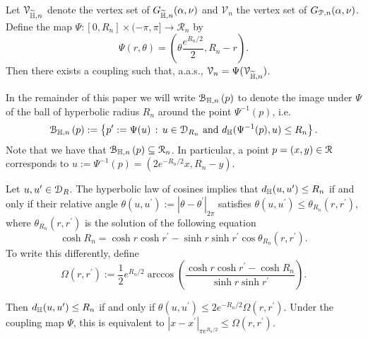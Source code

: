 \begin{lemma}\label{lem:coupling_hyperbolic_poisson}
Let $\mathcal{V}_{\widetilde{\mathbb{H}}, n}$ denote the vertex set of $G_{\widetilde{\mathbb{H}},n}(\alpha, \nu)$ and $\mathcal{V}_n$ the vertex set of $G_{{\mathcal P},n}(\alpha, \nu)$. Define the map $\Psi : [0,R_n] \times (-\pi, \pi] \to \mathcal{R}_n$ by
\begin{equation}\label{eq:def_Psi}
	\Psi(r,\theta) = \left(\theta \frac{e^{R_n/2}}{2}, R_n - r\right).
\end{equation}
Then there exists a coupling such that, a.a.s., $\mathcal{V}_n = \Psi(\mathcal{V}_{\widetilde{\mathbb{H}},n})$. %
\end{lemma}

In the remainder of this paper we will write ${\mathcal B}_{\mathbb{H},n}\left(p\right)$ to denote the image under $\Psi$ of the ball of hyperbolic radius $R_n$ around the point $\Psi^{-1}(p)$, i.e. 
\[
	{\mathcal B}_{\mathbb{H},n}\left(p\right) := \left\{p^\prime := \Psi(u) \, : \, u \in {\mathcal D}_{R_n} \text{ and } d_{\mathbb{H}}(\Psi^{-1}(p),u) \le R_n\right\}.
\]
Note that we have that ${\mathcal B}_{\mathbb{H},n}\left(p\right) \subseteq \mathcal{R}_n$. In particular, a point $p = (x,y) \in {\mathcal R}$ corresponds to $u := \Psi^{-1}(p) = (2 e^{-R_n/2} x, R_n - y)$. 

Let $u, u^\prime \in {\mathcal D}_R$. The hyperbolic law of cosines implies that $d_{\mathbb{H}}(u,u^\prime) \leq R_n$ if and only if their relative angle $\theta(u, u^\prime) := |\theta - \theta^\prime|_{2\pi}$ satisfies $\theta(u, u^\prime) \leq \theta_{R_n}(r,r^\prime)$, where $\theta_{R_n}(r,r^\prime)$ is the solution of the following equation
\[
	\cosh R_n =\cosh r \cosh r^\prime - \sinh r \sinh r^\prime \cos \theta_{R_n}(r,r^\prime).
\]
To write this differently, define
\begin{equation}\label{eq:def_Omega_hyperbolic}
	\Omega(r,r^\prime) := \frac{1}{2}e^{R_n/2} \arccos\left( \frac{\cosh r \cosh r^\prime - \cosh R_n}
	{\sinh r \sinh r^\prime} \right).
\end{equation}


Then $d_{\mathbb{H}}(u,u^\prime) \leq R_n$ if and only if $\theta(u, u^\prime) \leq 2 e^{-R_n/2}\Omega(r,r^\prime)$. Under the coupling map $\Psi$, this is equivalent to $|x-x^\prime|_{\pi e^{R_n/2}} \le \Omega(r,r^\prime)$.

